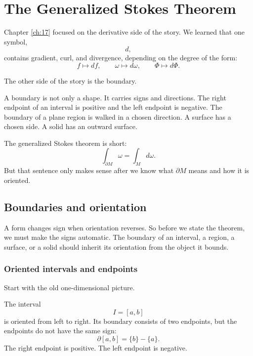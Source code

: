 
\chapter{The Generalized Stokes Theorem}
\label{ch:18}

Chapter \ref{ch:17} focused on the derivative side of the story.  We learned that one
symbol,
\[
    d,
\]
contains gradient, curl, and divergence, depending on the degree of the form:
\[
    f\mapsto df,\qquad
    \omega\mapsto d\omega,\qquad
    \Phi\mapsto d\Phi.
\]

The other side of the story is the boundary.

A boundary is not only a shape.  It carries signs and directions.  The right endpoint of
an interval is positive and the left endpoint is negative.  The boundary of a plane region
is walked in a chosen direction.  A surface has a chosen side.  A solid has an outward
surface.

The generalized Stokes theorem is short:
\[
    \int_{\partial M}\omega=\int_M d\omega.
\]
But that sentence only makes sense after we know what \(\partial M\) means and how it
is oriented.

\section{Boundaries and orientation}
\label{sec:18.1}

A form changes sign when orientation reverses.  So before we state the theorem, we
must make the signs automatic.  The boundary of an interval, a region, a surface, or a
solid should inherit its orientation from the object it bounds.

\subsection{Oriented intervals and endpoints}

Start with the old one-dimensional picture.

The interval
\[
    I=[a,b]
\]
is oriented from left to right.  Its boundary consists of two endpoints, but the endpoints
do not have the same sign:
\[
\boxed{
    \partial[a,b]=\{b\}-\{a\}.
}
\]
The right endpoint is positive.  The left endpoint is negative.

